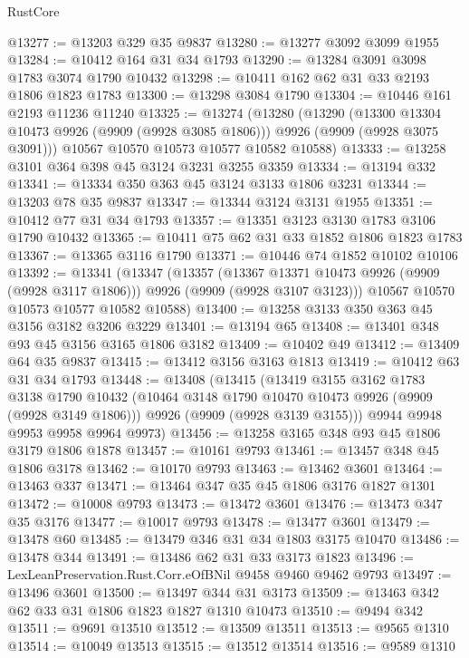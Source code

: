 \begin{lexlean}{RustCore}
\begin{coremodule}
@13277 := @13203 @329 @35 @9837
@13280 := @13277 @3092 @3099 @1955
@13284 := @10412 @164 @31 @34 @1793
@13290 := @13284 @3091 @3098 @1783 @3074 @1790 @10432
@13298 := @10411 @162 @62 @31 @33 @2193 @1806 @1823 @1783
@13300 := @13298 @3084 @1790
@13304 := @10446 @161 @2193 @11236 @11240
@13325 := @13274
    (@13280
      (@13290
        (@13300 @13304 @10473 @9926 (@9909 (@9928 @3085 @1806)))
        @9926
        (@9909 (@9928 @3075 @3091)))
      @10567
      @10570
      @10573
      @10577
      @10582
      @10588)
@13333 := @13258 @3101 @364 @398 @45 @3124 @3231 @3255 @3359
@13334 := @13194 @332
@13341 := @13334 @350 @363 @45 @3124 @3133 @1806 @3231
@13344 := @13203 @78 @35 @9837
@13347 := @13344 @3124 @3131 @1955
@13351 := @10412 @77 @31 @34 @1793
@13357 := @13351 @3123 @3130 @1783 @3106 @1790 @10432
@13365 := @10411 @75 @62 @31 @33 @1852 @1806 @1823 @1783
@13367 := @13365 @3116 @1790
@13371 := @10446 @74 @1852 @10102 @10106
@13392 := @13341
    (@13347
      (@13357
        (@13367 @13371 @10473 @9926 (@9909 (@9928 @3117 @1806)))
        @9926
        (@9909 (@9928 @3107 @3123)))
      @10567
      @10570
      @10573
      @10577
      @10582
      @10588)
@13400 := @13258 @3133 @350 @363 @45 @3156 @3182 @3206 @3229
@13401 := @13194 @65
@13408 := @13401 @348 @93 @45 @3156 @3165 @1806 @3182
@13409 := @10402 @49
@13412 := @13409 @64 @35 @9837
@13415 := @13412 @3156 @3163 @1813
@13419 := @10412 @63 @31 @34 @1793
@13448 := @13408
    (@13415
      (@13419
        @3155
        @3162
        @1783
        @3138
        @1790
        @10432
        (@10464 @3148 @1790 @10470 @10473 @9926 (@9909 (@9928 @3149 @1806)))
        @9926
        (@9909 (@9928 @3139 @3155)))
      @9944
      @9948
      @9953
      @9958
      @9964
      @9973)
@13456 := @13258 @3165 @348 @93 @45 @1806 @3179 @1806 @1878
@13457 := @10161 @9793
@13461 := @13457 @348 @45 @1806 @3178
@13462 := @10170 @9793
@13463 := @13462 @3601
@13464 := @13463 @337
@13471 := @13464 @347 @35 @45 @1806 @3176 @1827 @1301
@13472 := @10008 @9793
@13473 := @13472 @3601
@13476 := @13473 @347 @35 @3176
@13477 := @10017 @9793
@13478 := @13477 @3601
@13479 := @13478 @60
@13485 := @13479 @346 @31 @34 @1803 @3175 @10470
@13486 := @13478 @344
@13491 := @13486 @62 @31 @33 @3173 @1823
@13496 := LexLeanPreservation.Rust.Corr.eOfBNil @9458 @9460 @9462 @9793
@13497 := @13496 @3601
@13500 := @13497 @344 @31 @3173
@13509 := @13463 @342 @62 @33 @31 @1806 @1823 @1827 @1310 @10473
@13510 := @9494 @342
@13511 := @9691 @13510
@13512 := @13509 @13511
@13513 := @9565 @1310
@13514 := @10049 @13513
@13515 := @13512 @13514
@13516 := @9589 @1310

\end{coremodule}
\end{lexlean}
